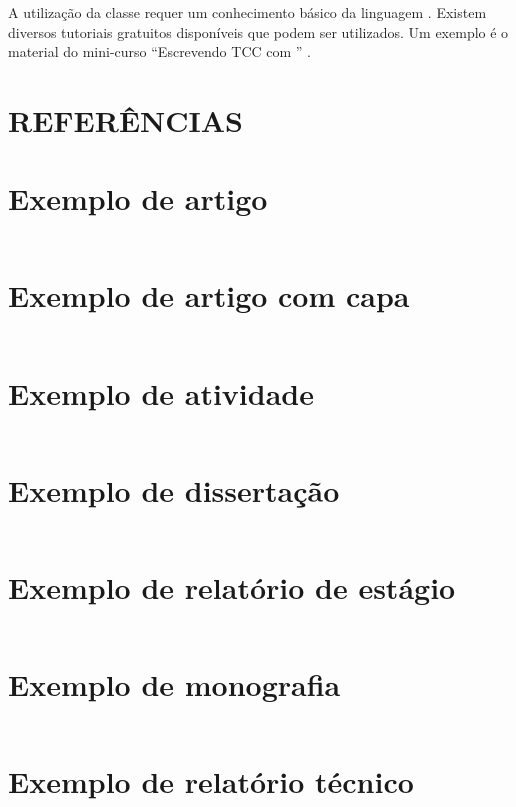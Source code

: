 \documentclass[artigo]{iftex2024}
\begin{document}
A utilização da classe requer um conhecimento básico da linguagem \latex.
Existem diversos tutoriais gratuitos disponíveis que podem ser utilizados.
Um exemplo é o material do mini-curso \enquote{Escrevendo TCC com \latex} \cite{ribeiro:2023:latex}.

\section*{REFERÊNCIAS}

\printbibliography[notkeyword=exemplo]

\appendix

\newpage
\section{Exemplo de artigo} \label{ap:exemplo_artigo}

\inputminted[linenos]{latex}{exemplo_artigo.tex}

\newpage
\section{Exemplo de artigo com capa} \label{ap:exemplo_artigo_capa}

\inputminted[linenos]{latex}{exemplo_artigo_capa.tex}

\newpage
\section{Exemplo de atividade} \label{ap:exemplo_atividade}

\inputminted[linenos]{latex}{exemplo_atividade.tex}

\newpage
\section{Exemplo de dissertação} \label{ap:exemplo_dissertacao}

\inputminted[linenos]{latex}{exemplo_dissertacao.tex}

\newpage
\section{Exemplo de relatório de estágio} \label{ap:exemplo_estagio}

\inputminted[linenos]{latex}{exemplo_relatorio_estagio.tex}

\newpage
\section{Exemplo de monografia} \label{ap:exemplo_monografia}

\inputminted[linenos]{latex}{exemplo_monografia.tex}

\newpage
\section{Exemplo de relatório técnico} \label{ap:exemplo_relatorio_tecnico}

\inputminted[linenos]{latex}{exemplo_relatorio_tecnico.tex}
\end{document}
